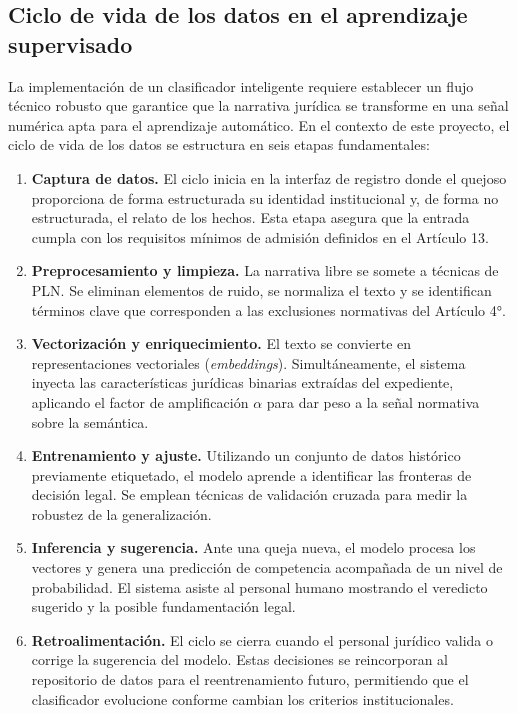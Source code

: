 \subsection{Ciclo de vida de los datos en el aprendizaje supervisado}

La implementación de un clasificador inteligente requiere establecer un flujo
técnico robusto que garantice que la narrativa jurídica se transforme en una
señal numérica apta para el aprendizaje automático. En el contexto de este
proyecto, el ciclo de vida de los datos se estructura en seis etapas
fundamentales:

\begin{enumerate}
  \item \textbf{Captura de datos.} El ciclo inicia en la interfaz de registro
        donde el quejoso proporciona de forma estructurada su identidad
        institucional y, de forma no estructurada, el relato de los hechos.
        Esta etapa asegura que la entrada cumpla con los requisitos mínimos de
        admisión definidos en el Artículo 13.

  \item \textbf{Preprocesamiento y limpieza.} La narrativa libre se somete a
        técnicas de PLN. Se eliminan elementos de ruido, se normaliza el texto
        y se identifican términos clave que corresponden a las exclusiones
        normativas del Artículo 4°.

  \item \textbf{Vectorización y enriquecimiento.} El texto se convierte en
        representaciones vectoriales (\textit{embeddings}). Simultáneamente,
        el sistema inyecta las características jurídicas binarias extraídas del
        expediente, aplicando el factor de amplificación $\alpha$ para dar peso
        a la señal normativa sobre la semántica.

  \item \textbf{Entrenamiento y ajuste.} Utilizando un conjunto de datos
        histórico previamente etiquetado, el modelo aprende a identificar las
        fronteras de decisión legal. Se emplean técnicas de validación cruzada
        para medir la robustez de la generalización.

  \item \textbf{Inferencia y sugerencia.} Ante una queja nueva, el modelo
        procesa los vectores y genera una predicción de competencia acompañada
        de un nivel de probabilidad. El sistema asiste al personal humano
        mostrando el veredicto sugerido y la posible fundamentación legal.

  \item \textbf{Retroalimentación.} El ciclo se cierra cuando el personal
        jurídico valida o corrige la sugerencia del modelo. Estas decisiones
        se reincorporan al repositorio de datos para el reentrenamiento futuro,
        permitiendo que el clasificador evolucione conforme cambian los criterios
        institucionales.
\end{enumerate}

